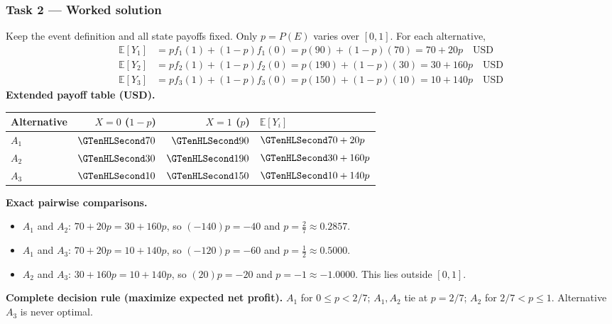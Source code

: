 \clearpage\subsubsection*{Task 2 --- Worked solution}\label{sol:c3-agriculture-decision}
Keep the event definition and all state payoffs fixed. Only $p=P(E)$ varies over $[0,1]$. For each alternative,
\begin{align*}
\mathbb E[Y_1]&=p f_1(1)+(1-p)f_1(0)=p(90)+(1-p)(70)=70+20p\quad\text{USD}\\
\mathbb E[Y_2]&=p f_2(1)+(1-p)f_2(0)=p(190)+(1-p)(30)=30+160p\quad\text{USD}\\
\mathbb E[Y_3]&=p f_3(1)+(1-p)f_3(0)=p(150)+(1-p)(10)=10+140p\quad\text{USD}
\end{align*}
\textbf{Extended payoff table (USD).}\begin{center}\begin{tabular}{lrrl}\toprule Alternative & $X=0$ ($1-p$) & $X=1$ ($p$) & $\mathbb E[Y_i]$\\\midrule
$A_1$ & $\Money{70}$ & $\Money{90}$ & $\Money{70+20p}$\\
$A_2$ & $\Money{30}$ & $\Money{190}$ & $\Money{30+160p}$\\
$A_3$ & $\Money{10}$ & $\Money{150}$ & $\Money{10+140p}$\\
\bottomrule\end{tabular}\end{center}
\textbf{Exact pairwise comparisons.}\begin{itemize}
\item $A_1$ and $A_2$: $70+20p=30+160p$, so $(-140)p=-40$ and $p=\frac{2}{7}\approx 0.2857$.
\item $A_1$ and $A_3$: $70+20p=10+140p$, so $(-120)p=-60$ and $p=\frac{1}{2}\approx 0.5000$.
\item $A_2$ and $A_3$: $30+160p=10+140p$, so $(20)p=-20$ and $p=-1\approx -1.0000$. This lies outside $[0,1]$.
\end{itemize}
\textbf{Complete decision rule (maximize expected net profit).} $A_1$ for $0\leq p<2/7$; $A_1,A_2$ tie at $p=2/7$; $A_2$ for $2/7<p\leq1$. Alternative $A_3$ is never optimal.


